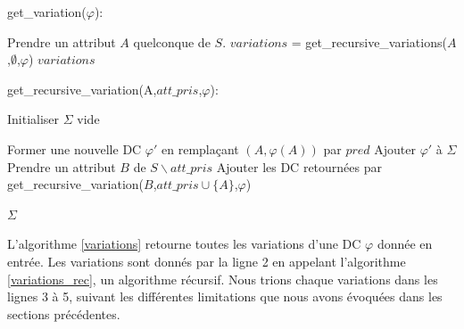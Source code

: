 \documentclass[letterpaper, 12pt]{report}
\theoremstyle{definition}
\begin{document}
\IncMargin{1em}
\begin{algorithm}
\label{variations}

	\DontPrintSemicolon
  \caption{get\_variation($\varphi$):}
  \LinesNumbered

    Prendre un attribut $A$ quelconque de $S$.\;
    $variations$ = get\_recursive\_variations($A$,$\emptyset$,$\varphi$)\;
    \Return $variations$
\end{algorithm}\DecMargin{1em}


\IncMargin{1em}
\begin{algorithm}
\label{variations_rec}

	\DontPrintSemicolon
  \caption{get\_recursive\_variation(A,$att\_pris$,$\varphi$):}
  \LinesNumbered

    Initialiser $\Sigma$ vide\;
    {
    	{
    		Former une nouvelle DC $\varphi'$ en remplaçant $(A,\varphi(A))$ par $pred$\;
    		Ajouter $\varphi'$ à $\Sigma$\;
    		Prendre un attribut $B$ de $S \backslash att\_pris$\;
    		Ajouter les DC retournées par get\_recursive\_variation($B$,$att\_pris \cup \{A\}$,$\varphi$)\;
    		
    	}
    }
    \Return $\Sigma$
\end{algorithm}\DecMargin{1em}

L'algorithme \ref{variations} retourne toutes les variations d'une DC $\varphi$ donnée en entrée. Les variations sont donnés par la ligne 2 en appelant l'algorithme \ref{variations_rec}, un algorithme récursif. Nous trions chaque variations dans les lignes 3 à 5, suivant les différentes limitations que nous avons évoquées dans les sections précédentes.\\
\end{document}
